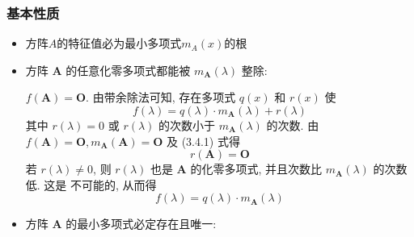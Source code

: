 \documentclass{article}
\begin{document}
				\subsubsection*{基本性质}
				\begin{itemize}
					\item 方阵$A$的特征值必为最小多项式$m_A(x)$的根
					\item 方阵 $\boldsymbol{A}$ 的任意化零多项式都能被 $m_{\boldsymbol A}(\lambda)$ 整除:

					$f(\boldsymbol{A})=\boldsymbol{O}$. 由带余除法可知, 存在多项式 $q(x)$ 和 $r(x)$ 使
					$$
					f(\lambda)=q(\lambda) \cdot m_{\boldsymbol A}(\lambda)+r(\lambda)
					$$
					其中 $r(\lambda)=0$ 或 $r(\lambda)$ 的次数小于 $m_{\boldsymbol{A}}(\lambda)$ 的次数. 由 $f(\boldsymbol{A})=\boldsymbol{O}, m_{\boldsymbol{A}}(\boldsymbol{A})=\boldsymbol{O}$ 及 (3.4.1) 式得
					$$
					r(\boldsymbol{A})=\boldsymbol{O}
					$$
					若 $r(\lambda) \neq 0$, 则 $r(\lambda)$ 也是 $\boldsymbol{A}$ 的化零多项式, 并且次数比 $m_{\boldsymbol{A}}(\lambda)$ 的次数低. 这是 不可能的, 从而得
					$$
					f(\lambda)=q(\lambda) \cdot m_{\boldsymbol{A}}(\lambda)
					$$
					\item 方阵 $\boldsymbol{A}$ 的最小多项式必定存在且唯一:


\end{itemize}
\end{document}
